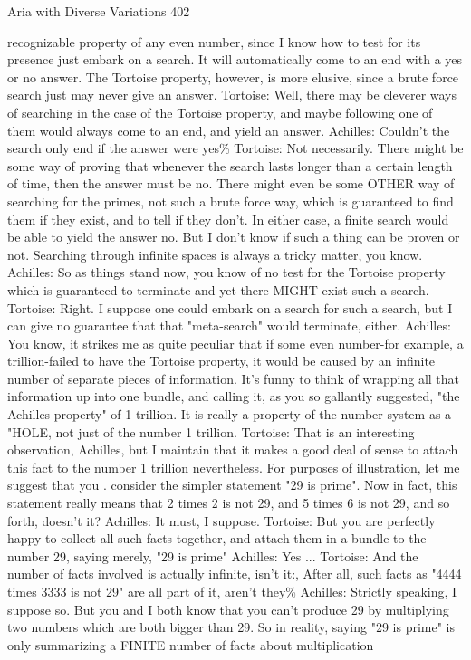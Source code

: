 Aria with Diverse Variations                                                            402

    recognizable property of any even number, since I know how to test for its presence
    just embark on a search. It will automatically come to an end with a yes or no
    answer. The Tortoise property, however, is more elusive, since a brute force search
    just may never give an answer.
Tortoise: Well, there may be cleverer ways of searching in the case of the Tortoise
    property, and maybe following one of them would always come to an end, and yield
    an answer.
Achilles: Couldn't the search only end if the answer were yes\%
Tortoise: Not necessarily. There might be some way of proving that whenever the search
    lasts longer than a certain length of time, then the answer must be no. There might
    even be some OTHER way of searching for the primes, not such a brute force way,
    which is guaranteed to find them if they exist, and to tell if they don't. In either case,
    a finite search would be able to yield the answer no. But I don't know if such a thing
    can be proven or not. Searching through infinite spaces is always a tricky matter, you
    know.
Achilles: So as things stand now, you know of no test for the Tortoise property which is
    guaranteed to terminate-and yet there MIGHT exist such a search.
Tortoise: Right. I suppose one could embark on a search for such a search, but I can give
    no guarantee that that "meta-search" would terminate, either.
Achilles: You know, it strikes me as quite peculiar that if some even number-for
    example, a trillion-failed to have the Tortoise property, it would be caused by an
    infinite number of separate pieces of information. It's funny to think of wrapping all
    that information up into one bundle, and calling it, as you so gallantly suggested,
    "the Achilles property" of 1 trillion. It is really a property of the number system as a
    "HOLE, not just of the number 1 trillion.
Tortoise: That is an interesting observation, Achilles, but I maintain that it makes a good
    deal of sense to attach this fact to the number 1 trillion nevertheless. For purposes of
    illustration, let me suggest that you . consider the simpler statement "29 is prime".
    Now in fact, this statement really means that 2 times 2 is not 29, and 5 times 6 is not
    29, and so forth, doesn't it?
Achilles: It must, I suppose.
Tortoise: But you are perfectly happy to collect all such facts together, and attach them in
    a bundle to the number 29, saying merely, "29 is prime"
Achilles: Yes ...
Tortoise: And the number of facts involved is actually infinite, isn't it:, After all, such
    facts as "4444 times 3333 is not 29" are all part of it, aren't they\%
Achilles: Strictly speaking, I suppose so. But you and I both know that you can't produce
    29 by multiplying two numbers which are both bigger than 29. So in reality, saying
    "29 is prime" is only summarizing a FINITE number of facts about multiplication




